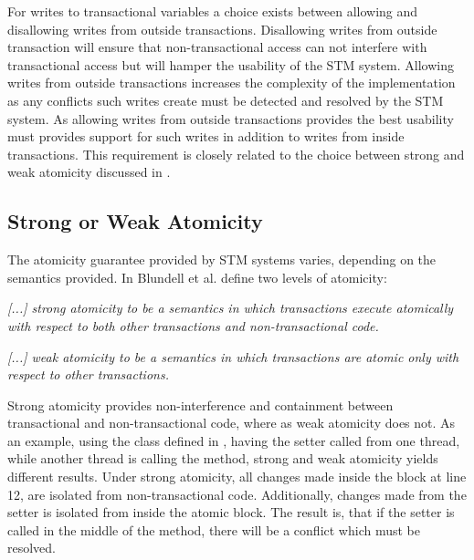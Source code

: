 For writes to transactional variables a choice exists between allowing and disallowing writes from outside transactions. Disallowing writes from outside transaction will ensure that non-transactional access can not interfere with transactional access but will hamper the usability of the \ac{STM} system. Allowing writes from outside transactions increases the complexity of the implementation as any conflicts such writes create must be detected and resolved by the \ac{STM} system. As allowing writes from outside transactions provides the best usability \stmnamesp must provides support for such writes in addition to writes from inside transactions. This requirement is closely related to the choice between strong and weak atomicity discussed in .

\subsection{Strong or Weak Atomicity}
\label{sec:design_strong_weak_atomicity}
The atomicity guarantee provided by \ac{STM} systems varies, depending on the semantics provided. In \cite{blundell2006subtleties} Blundell et al. define two levels of atomicity:
%
\begin{defn}\label{def:strong_atomicity}
\emph{[...] strong atomicity to be a semantics in which transactions execute atomically
with respect to both other transactions and non-transactional code.}
\end{defn}
%
\begin{defn}\label{def:weak_atomicity}
\emph{[...] weak atomicity to be a semantics in which transactions are atomic only with respect to other transactions.}
\end{defn}

Strong atomicity provides non-interference and containment between transactional and non-transactional code, where as weak atomicity does not. As an example, using the  class defined in , having the  setter called from one thread, while another thread is calling the  method, strong and weak atomicity yields different results. Under strong atomicity, all changes made inside the  block at line 12, are isolated from non-transactional code. Additionally, changes made from the setter is isolated from inside the atomic block. The result is, that if the setter is called in the middle of the  method, there will be a conflict which must be resolved. 


